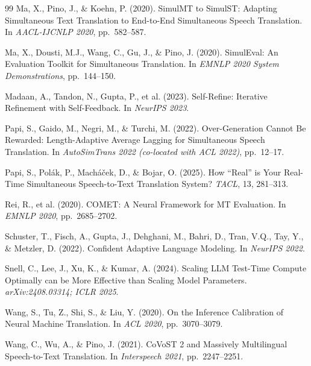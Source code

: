 \begin{thebibliography}{99}
Ma, X., Pino, J., \& Koehn, P. (2020).
\newblock SimulMT to SimulST: Adapting Simultaneous Text Translation to End-to-End Simultaneous Speech Translation.
\newblock In \emph{AACL-IJCNLP 2020}, pp.\ 582--587.

Ma, X., Dousti, M.J., Wang, C., Gu, J., \& Pino, J. (2020).
\newblock SimulEval: An Evaluation Toolkit for Simultaneous Translation.
\newblock In \emph{EMNLP 2020 System Demonstrations}, pp.\ 144--150.

Madaan, A., Tandon, N., Gupta, P., et al. (2023).
\newblock Self-Refine: Iterative Refinement with Self-Feedback.
\newblock In \emph{NeurIPS 2023}.

Papi, S., Gaido, M., Negri, M., \& Turchi, M. (2022).
\newblock Over-Generation Cannot Be Rewarded: Length-Adaptive Average Lagging for Simultaneous Speech Translation.
\newblock In \emph{AutoSimTrans 2022 (co-located with ACL 2022)}, pp.\ 12--17.

Papi, S., Pol\'{a}k, P., Mach\'{a}\v{c}ek, D., \& Bojar, O. (2025).
\newblock How ``Real'' is Your Real-Time Simultaneous Speech-to-Text Translation System?
\newblock \emph{TACL}, 13, 281--313.

Rei, R., et al. (2020).
\newblock COMET: A Neural Framework for MT Evaluation.
\newblock In \emph{EMNLP 2020}, pp.\ 2685--2702.

Schuster, T., Fisch, A., Gupta, J., Dehghani, M., Bahri, D., Tran, V.Q., Tay, Y., \& Metzler, D. (2022).
\newblock Confident Adaptive Language Modeling.
\newblock In \emph{NeurIPS 2022}.

Snell, C., Lee, J., Xu, K., \& Kumar, A. (2024).
\newblock Scaling LLM Test-Time Compute Optimally can be More Effective than Scaling Model Parameters.
\newblock \emph{arXiv:2408.03314; ICLR 2025}.

Wang, S., Tu, Z., Shi, S., \& Liu, Y. (2020).
\newblock On the Inference Calibration of Neural Machine Translation.
\newblock In \emph{ACL 2020}, pp.\ 3070--3079.

Wang, C., Wu, A., \& Pino, J. (2021).
\newblock CoVoST 2 and Massively Multilingual Speech-to-Text Translation.
\newblock In \emph{Interspeech 2021}, pp.\ 2247--2251.


\end{thebibliography}

